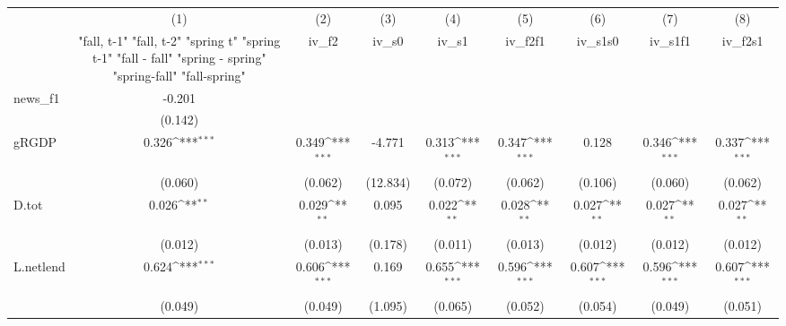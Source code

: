 {
\def\sym#1{\ifmmode^{#1}\else\(^{#1}\)\fi}
\begin{tabular}{l*{8}{c}}
\toprule
            &\multicolumn{1}{c}{(1)}&\multicolumn{1}{c}{(2)}&\multicolumn{1}{c}{(3)}&\multicolumn{1}{c}{(4)}&\multicolumn{1}{c}{(5)}&\multicolumn{1}{c}{(6)}&\multicolumn{1}{c}{(7)}&\multicolumn{1}{c}{(8)}\\
            &\multicolumn{1}{c}{  "fall, t-1" "fall, t-2" "spring t" "spring t-1"  "fall - fall" "spring - spring" "spring-fall" "fall-spring" }&\multicolumn{1}{c}{iv\_f2}&\multicolumn{1}{c}{iv\_s0}&\multicolumn{1}{c}{iv\_s1}&\multicolumn{1}{c}{iv\_f2f1}&\multicolumn{1}{c}{iv\_s1s0}&\multicolumn{1}{c}{iv\_s1f1}&\multicolumn{1}{c}{iv\_f2s1}\\
\midrule
news\_f1     &      -0.201         &                     &                     &                     &                     &                     &                     &                     \\
            &     (0.142)         &                     &                     &                     &                     &                     &                     &                     \\
\addlinespace
gRGDP       &       0.326\sym{***}&       0.349\sym{***}&      -4.771         &       0.313\sym{***}&       0.347\sym{***}&       0.128         &       0.346\sym{***}&       0.337\sym{***}\\
            &     (0.060)         &     (0.062)         &    (12.834)         &     (0.072)         &     (0.062)         &     (0.106)         &     (0.060)         &     (0.062)         \\
\addlinespace
D.tot       &       0.026\sym{**} &       0.029\sym{**} &       0.095         &       0.022\sym{**} &       0.028\sym{**} &       0.027\sym{**} &       0.027\sym{**} &       0.027\sym{**} \\
            &     (0.012)         &     (0.013)         &     (0.178)         &     (0.011)         &     (0.013)         &     (0.012)         &     (0.012)         &     (0.012)         \\
\addlinespace
L.netlend   &       0.624\sym{***}&       0.606\sym{***}&       0.169         &       0.655\sym{***}&       0.596\sym{***}&       0.607\sym{***}&       0.596\sym{***}&       0.607\sym{***}\\
            &     (0.049)         &     (0.049)         &     (1.095)         &     (0.065)         &     (0.052)         &     (0.054)         &     (0.049)         &     (0.051)         \\

\end{tabular}}
